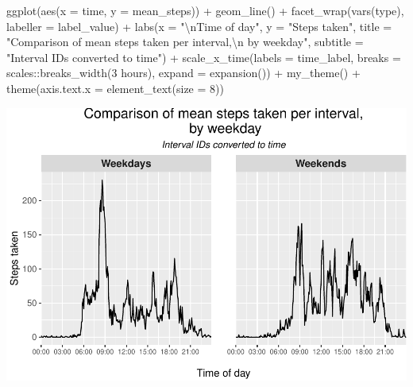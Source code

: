 \documentclass[
  paper=a4,
  ,captions=tableheading
]{scrartcl}
\newenvironment{Shaded}{\begin{snugshade}}{\end{snugshade}}
\newcommand{\AttributeTok}[1]{\textcolor[rgb]{0.77,0.63,0.00}{#1}}
\newcommand{\DecValTok}[1]{\textcolor[rgb]{0.00,0.00,0.81}{#1}}
\newcommand{\FunctionTok}[1]{\textcolor[rgb]{0.00,0.00,0.00}{#1}}
\newcommand{\NormalTok}[1]{#1}
\newcommand{\SpecialCharTok}[1]{\textcolor[rgb]{0.00,0.00,0.00}{#1}}
\newcommand{\StringTok}[1]{\textcolor[rgb]{0.31,0.60,0.02}{#1}}
\begin{document}
\begin{Shaded}
\begin{Highlighting}[]
\FunctionTok{ggplot}\NormalTok{(}\FunctionTok{aes}\NormalTok{(}\AttributeTok{x =}\NormalTok{ time, }\AttributeTok{y =}\NormalTok{ mean\_steps)) }\SpecialCharTok{+}
  \FunctionTok{geom\_line}\NormalTok{() }\SpecialCharTok{+}
  \FunctionTok{facet\_wrap}\NormalTok{(}\FunctionTok{vars}\NormalTok{(type), }\AttributeTok{labeller =}\NormalTok{ label\_value) }\SpecialCharTok{+}
  \FunctionTok{labs}\NormalTok{(}\AttributeTok{x =} \StringTok{"}\SpecialCharTok{\textbackslash{}n}\StringTok{Time of day"}\NormalTok{,}
       \AttributeTok{y =} \StringTok{"Steps taken"}\NormalTok{,}
       \AttributeTok{title =} \StringTok{"Comparison of mean steps taken per interval,}\SpecialCharTok{\textbackslash{}n}\StringTok{ by weekday"}\NormalTok{,}
       \AttributeTok{subtitle =} \StringTok{"Interval IDs converted to time"}\NormalTok{) }\SpecialCharTok{+}
  \FunctionTok{scale\_x\_time}\NormalTok{(}\AttributeTok{labels =}\NormalTok{ time\_label,}
               \AttributeTok{breaks =}\NormalTok{ scales}\SpecialCharTok{::}\FunctionTok{breaks\_width}\NormalTok{(}\StringTok{\textquotesingle{}3 hours\textquotesingle{}}\NormalTok{),}
               \AttributeTok{expand =} \FunctionTok{expansion}\NormalTok{()) }\SpecialCharTok{+}
  \FunctionTok{my\_theme}\NormalTok{() }\SpecialCharTok{+}
  \FunctionTok{theme}\NormalTok{(}\AttributeTok{axis.text.x =} \FunctionTok{element\_text}\NormalTok{(}\AttributeTok{size =} \DecValTok{8}\NormalTok{))}
\end{Highlighting}
\end{Shaded}

\includegraphics{PA1_template_files/figure-latex/weekday-plot-1.pdf}
\end{document}
